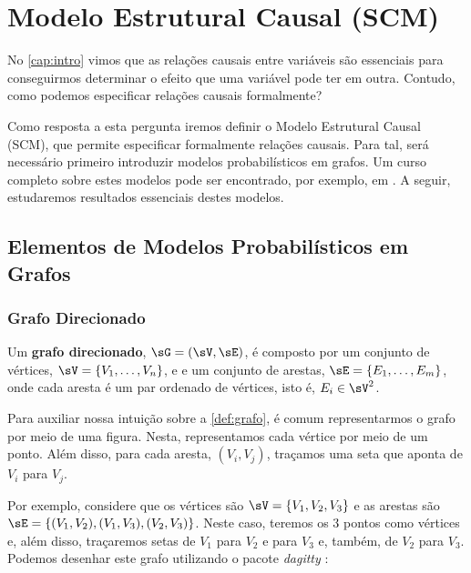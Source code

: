 \chapter{Modelo Estrutural Causal (SCM)}
\label{cap:dag}

No \cref{cap:intro} vimos que 
as relações causais entre variáveis são
essenciais para conseguirmos determinar
o efeito que uma variável pode ter em outra.
Contudo, como podemos especificar
relações causais formalmente?

Como resposta a esta pergunta iremos
definir o Modelo Estrutural Causal (SCM),
que permite especificar formalmente relações causais.
Para tal, será necessário primeiro introduzir
modelos probabilísticos em grafos.
Um curso completo sobre estes modelos 
pode ser encontrado, por exemplo,
em \citet{Maua2022}.
A seguir, estudaremos resultados
essenciais destes modelos.

\section{Elementos de Modelos Probabilísticos em Grafos}

\subsection{Grafo Direcionado}

\begin{definition}
 \label{def:grafo}
 Um \textbf{grafo direcionado}, 
 $\sG = (\sV, \sE)$,
 é composto por um conjunto de vértices,
 $\sV = \{V_1, \ldots, V_n\}$, e
 e um conjunto de arestas,
 $\sE = \{E_1, \ldots, E_m\}$, onde
 cada aresta é um par ordenado de vértices, isto é,
 $E_i \in \sV^2$.
\end{definition}

Para auxiliar nossa intuição sobre a
\cref{def:grafo}, é comum representarmos
o grafo por meio de uma figura.
Nesta, representamos cada vértice por meio de um ponto.
Além disso, para cada aresta, $(V_i, V_j)$,
traçamos uma seta que aponta de $V_i$ para $V_j$.

Por exemplo, considere que os vértices são
$\sV = \{V_1, V_2, V_3\}$ e as arestas são
$\sE = \{(V_1, V_2), (V_1, V_3), (V_2, V_3)\}$.
Neste caso, teremos os $3$ pontos como vértices e,
além disso, traçaremos setas de $V_1$ para $V_2$ e para $V_3$ e,
também, de $V_2$ para $V_3$.
Podemos desenhar este grafo utilizando o
pacote \textit{dagitty} \citep{Textor2016}:

